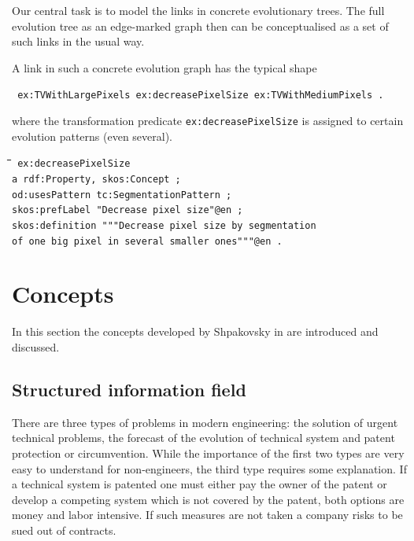 \documentclass[11pt,a4paper]{article}
\newenvironment{code}{\tt \begin{tabbing}
\hskip12pt\=\hskip12pt\=\hskip12pt\=\hskip12pt\=\hskip5cm\=\hskip5cm\=\kill}
{\end{tabbing}}
\begin{document}
Our central task is to model the links in concrete evolutionary trees. The
full evolution tree as an edge-marked graph then can be conceptualised as a
set of such links in the usual way.

A link in such a concrete evolution graph has the typical shape
\begin{center}\tt
  ex:TVWithLargePixels ex:decreasePixelSize ex:TVWithMediumPixels .
\end{center}
where the transformation predicate \texttt{ex:decreasePixelSize} is assigned
to certain evolution patterns (even several).
\begin{code}\tt
ex:decreasePixelSize \\
\> a rdf:Property, skos:Concept ; \\
\> od:usesPattern tc:SegmentationPattern ; \\
\> skos:prefLabel "Decrease pixel size"@en ; \\
\> skos:definition """Decrease pixel size by segmentation \\
\>\> of one big pixel in several smaller ones"""@en .
\end{code}

\section{Concepts}

In this section the concepts developed by Shpakovsky in \cite{Shpakovsky2016}
are introduced and discussed.

\subsection{Structured information field}

There are three types of problems in modern engineering: the solution of
urgent technical problems, the forecast of the evolution of technical system
and patent protection or circumvention. While the importance of the first two
types are very easy to understand for non-engineers, the third type requires
some explanation. If a technical system is patented one must either pay the
owner of the patent or develop a competing system which is not covered by the
patent, both options are money and labor intensive. If such measures are not
taken a company risks to be sued out of contracts.
\end{document}
